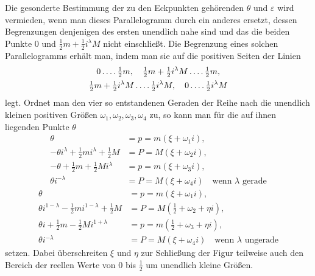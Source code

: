 Die gesonderte Bestimmung der zu den Eckpunkten gehörenden $\theta$ und $\varepsilon$ wird vermieden, wenn man dieses Parallelogramm durch ein anderes ersetzt, dessen Begrenzungen denjenigen des ersten
unendlich nahe sind und das die beiden Punkte $0$ und $\tfrac12m+\tfrac12i^\lambda M$ nicht einschließt. Die Begrenzung eines solchen Parallelogramms erhält man, indem man sie auf die positiven Seiten der Linien
\[
\begin{gathered}
0\mathinner{.\,.\,.\,.}\tfrac12m,\quad\tfrac12m+\tfrac12i^\lambda M\mathinner{.\,.\,.\,.}\tfrac12m,\\
\tfrac12m+\tfrac12i^\lambda M\mathinner{.\,.\,.\,.}\tfrac12i^\lambda M,\quad 0\mathinner{.\,.\,.\,.}\tfrac12i^\lambda M
\end{gathered}
\]
legt. Ordnet man den vier so entstandenen Geraden der Reihe nach die unendlich kleinen positiven Größen $\omega_1,\omega_2,\omega_3,\omega_4$ zu, so kann man für die auf ihnen liegenden Punkte $\theta$
\[
\begin{aligned}
\theta&=p=m(\xi+\omega_1i),\\
-\theta i^\lambda+\tfrac12mi^\lambda+\tfrac12M&=P=M(\xi+\omega_2i),\\
-\theta+\tfrac12m+\tfrac12Mi^\lambda&=p=m(\xi+\omega_3i),\\
\theta i^{-\lambda}&=P=M(\xi+\omega_4i)\quad\text{wenn }\lambda\text{ gerade}
\end{aligned}
\]
\[
\begin{aligned}
\theta&=p=m(\xi+\omega_1i),\\
\theta i^{1-\lambda}-\tfrac12mi^{1-\lambda}+\tfrac12M&=P=M(\tfrac12+\omega_2+\eta i),\\
\theta i+\tfrac12m-\tfrac12Mi^{1+\lambda}&=p=m(\tfrac12+\omega_3+\eta i),\\
\theta i^{-\lambda}&=P=M(\xi+\omega_4i)\quad\text{wenn }\lambda\text{ ungerade}
\end{aligned}
\]
setzen. Dabei überschreiten $\xi$ und $\eta$ zur Schließung der Figur teilweise auch den Bereich der reellen Werte von $0$ bis $\tfrac12$ um unendlich kleine Größen.

